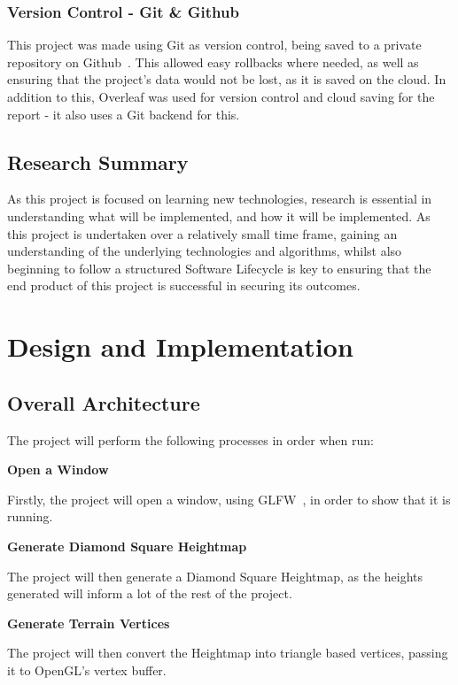 \documentclass[a4paper,10pt]{report}
\begin{document}
\subsection{Version Control - Git \& Github}
This project was made using Git as version control, being saved to a private repository on Github~\cite{github}. This allowed easy rollbacks where needed, as well as ensuring that the project's data would not be lost, as it is saved on the cloud. In addition to this, Overleaf was used for version control and cloud saving for the report - it also uses a Git backend for this.

\section{Research Summary}
As this project is focused on learning new technologies, research is essential in understanding what will be implemented, and how it will be implemented. As this project is undertaken over a relatively small time frame, gaining an understanding of the underlying technologies and algorithms, whilst also beginning to follow a structured Software Lifecycle is key to ensuring that the end product of this project is successful in securing its outcomes.


\chapter{Design and Implementation}

\section{Overall Architecture}

The project will perform the following processes in order when run: \bigskip

\textbf{Open a Window} \par
Firstly, the project will open a window, using GLFW~\cite{berglund2006glfw}, in order to show that it is running. \medskip

\textbf{Generate Diamond Square Heightmap} \par
The project will then generate a Diamond Square Heightmap, as the heights generated will inform a lot of the rest of the project. \medskip

\textbf{Generate Terrain Vertices} \par
The project will then convert the Heightmap into triangle based vertices, passing it to OpenGL's vertex buffer. \medskip
\end{document}
